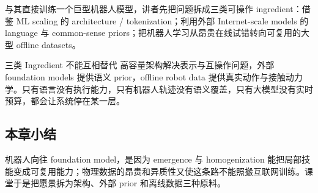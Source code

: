 与其直接训练一个巨型机器人模型，讲者先把问题拆成三类可操作 ingredient：借鉴 ML scaling 的 architecture / tokenization；利用外部 Internet-scale models 的 language 与 common-sense priors；把机器人学习从昂贵在线试错转向可复用的大型 offline datasets。


\begin{importantbox}{三类 Ingredient 不能互相替代}
高容量架构解决表示与互操作问题，外部 foundation models 提供语义 prior，offline robot data 提供真实动作与接触动力学。只有语言没有执行能力，只有机器人轨迹没有语义覆盖，只有大模型没有实时预算，都会让系统停在某一层。
\end{importantbox}

\subsection{本章小结}

机器人向往 foundation model，是因为 emergence 与 homogenization 能把局部技能变成可复用能力；物理数据的昂贵和异质性又使这条路不能照搬互联网训练。课堂于是把愿景拆为架构、外部 prior 和离线数据三种原料。

